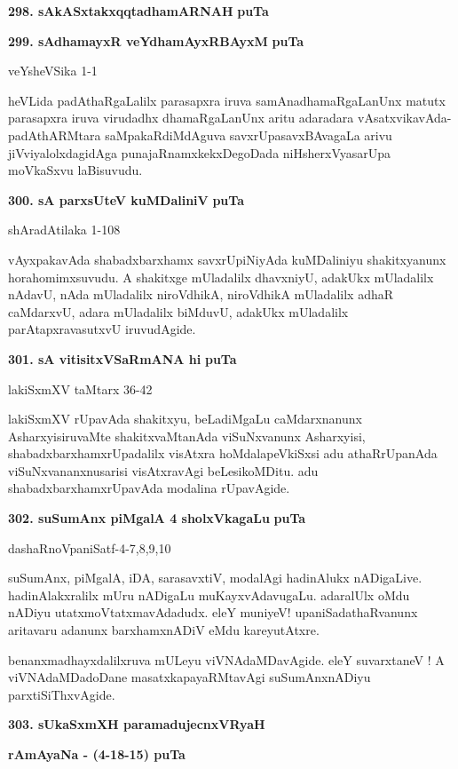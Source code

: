 {\medskip
\noindent
\textbf{298. sAkASxtakxqqtadhamARNAH} \hfill {\bf puTa \pageref{106}}

\smallskip
\noindent
\textbf{299. sAdhamayxR veYdhamAyxRBAyxM}  \hfill {\bf puTa \pageref{41}}

\hfill veYsheVSika 1-1

\smallskip
heVLida padAthaRgaLalilx parasapxra iruva samAnadhamaRgaLanUnx matutx para\-sapxra iruva virudadhx dhamaR\-gaLanUnx aritu adaradara vAsatxvikavAda-padAthARMtara saMpakaRdiMdAguva savxrUpasavxBAvagaLa arivu jiVviyalolxdagidAga punajaRnamxkekxDegoDada niHsherxVyasarUpa moVkaSxvu laBisuvudu.

\medskip
\noindent
\textbf{300. sA parxsUteV kuMDaliniV} \hfill {\bf puTa \pageref{59}}

\hfill shAradAtilaka 1-108

\smallskip
vAyxpakavAda shabadxbarxhamx savxrUpiNiyAda kuMDaliniyu shakitxyanunx hora\-homimxsuvudu. A shakitx\-ge mUladalilx dhavxniyU, adakUkx mUladalilx nAdavU, nAda mUladalilx niroVdhikA, niroV\-dhikA mUla\-dalilx adhaR caMdarxvU, adara mUladalilx biMduvU, adakUkx mUladalilx parAtapxravasutxvU iruvu\-dAgide.

\medskip
\noindent
\textbf{301. sA vitisitxVSaRmANA hi} \hfill {\bf puTa \pageref{157a}}

\hfill lakiSxmXV taMtarx 36-42

\smallskip
lakiSxmXV rUpavAda shakitxyu, beLadiMgaLu caMdarxnanunx AsharxyisiruvaMte shakitxvaMtanAda viSuNx\-vanunx Asharxyisi, shabadxbarxhamxrUpadalilx visAtxra hoMdalapeVkiSxsi adu athaR\-rUpa\-nAda viSuNxvananxnusarisi visAtxravAgi beLesikoMDitu. adu shabadxbarxhamxrUpavAda modalina rUpa\-vAgide.

\medskip
\noindent
\textbf{302. suSumAnx piMgalA 4 sholxVkagaLu} \hfill {\bf puTa \pageref{82}}

\hfill dashaRnoVpaniSatf-4-7,8,9,10

\smallskip
suSumAnx, piMgalA, iDA, sarasavxtiV, modalAgi hadinAlukx nADigaLive. hadinAlakxralilx mUru nADigaLu muKayxvAdavugaLu. adaralUlx oMdu nADiyu utatxmoVtatxmavAdadudx. eleY muniyeV! upa\-niSadathaRvanunx aritavaru adanunx barxhamxnADiV eMdu kareyutAtxre.

benanxmadhayxdalilxruva mULeyu viVNAdaMDavAgide. eleY suvarxtaneV ! A viVNAdaMDadoDane masatxka\-payaRMtavAgi suSumAnxnADiyu parxtiSiThxvAgide.

\medskip
\noindent
\textbf{303. sUkaSxmXH paramadujecnxVRyaH} 

\hfill {\bf rAmAyaNa - (4-18-15) puTa \pageref{40}}

}
